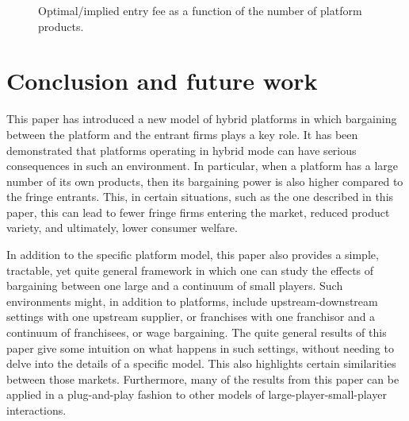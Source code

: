 \documentclass[a4paper]{article}
\begin{document}
\begin{figure}
    \centering
    \caption{Optimal/implied entry fee as a function of the number of platform products.}
    \label{fig:F_F_eq}
\end{figure}





\section{Conclusion and future work}
\label{sec:conclusion}

This paper has introduced a new model of hybrid platforms in which bargaining between the platform and the entrant firms plays a key role.
It has been demonstrated that platforms operating in hybrid mode can have serious consequences in such an environment.
In particular, when a platform has a large number of its own products, then its bargaining power is also higher compared to the fringe entrants.
This, in certain situations, such as the one described in this paper, this can lead to fewer fringe firms entering the market, reduced product variety, and ultimately, lower consumer welfare.

In addition to the specific platform model, this paper also provides a simple, tractable, yet quite general framework in which one can study the effects of bargaining between one large and a continuum of small players.
Such environments might, in addition to platforms, include upstream-downstream settings with one upstream supplier, or franchises with one franchisor and a continuum of franchisees, or wage bargaining.
The quite general results of this paper give some intuition on what happens in such settings, without needing to delve into the details of a specific model.
This also highlights certain similarities between those markets.
Furthermore, many of the results from this paper can be applied in a plug-and-play fashion to other models of large-player-small-player interactions.
\end{document}

